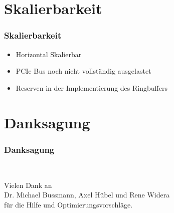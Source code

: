 \documentclass[ddcfooter]{tudbeamer}
\begin{document}
\section{Skalierbarkeit}
\begin{frame}
    \frametitle*{Skalierbarkeit}
    \begin{itemize}
        \item{Horizontal Skalierbar}
        \item{PCIe Bus noch nicht vollständig ausgelastet}
        \item{Reserven in der Implementierung des Ringbuffers}
    \end{itemize}

\end{frame}
\section{Danksagung}

\begin{frame}
    \frametitle*{Danksagung}

    \begin{block} ~
    \begin{center}
    Vielen Dank an \\Dr. Michael Bussmann, Axel Hübel und Rene Widera \\ für die Hilfe und Optimierungsvorschläge.
    \end{center}
    \end{block}

\end{frame}
\end{document}
